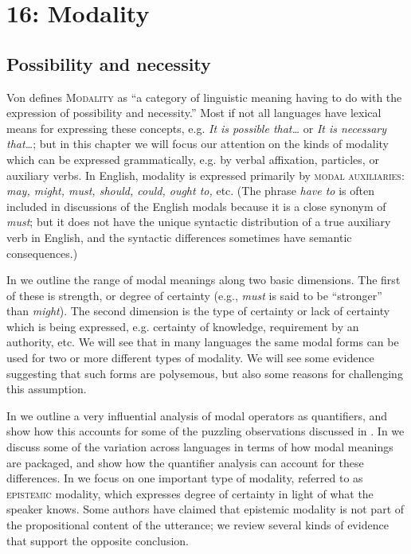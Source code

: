 \chapter{{16}: Modality}

\section{Possibility and necessity}\label{sec:} %

Von \citet{Fintel2006} defines \textsc{Modality} as “a category of linguistic meaning having to do with the expression of possibility and necessity.” Most if not all languages have lexical means for expressing these concepts, e.g. \textit{It is possible that…} or \textit{It is necessary} \textit{that…}; but in this chapter we will focus our attention on the kinds of modality which can be expressed grammatically, e.g. by verbal affixation, particles, or auxiliary verbs. In English, modality is expressed primarily by \textsc{modal auxiliaries}: \textit{may, might, must, should, could, ought to,} etc. (The phrase \textit{have to} is often included in discussions of the English modals because it is a close synonym of \textit{must}; but it does not have the unique syntactic distribution of a true auxiliary verb in English, and the syntactic differences sometimes have semantic consequences.)



In  we outline the range of modal meanings along two basic dimensions. The first of these is strength, or degree of certainty (e.g., \textit{must} is said to be “stronger” than \textit{might}). The second dimension is the type of certainty or lack of certainty which is being expressed, e.g. certainty of knowledge, requirement by an authority, etc. We will see that in many languages the same modal forms can be used for two or more different types of modality. We will see some evidence suggesting that such forms are polysemous, but also some reasons for challenging this assumption.



In  we outline a very influential analysis of modal operators as quantifiers, and show how this accounts for some of the puzzling observations discussed in . In  we discuss some of the variation across languages in terms of how modal meanings are packaged, and show how the quantifier analysis can account for these differences. In  we focus on one important type of modality, referred to as \textsc{epistemic} modality, which expresses degree of certainty in light of what the speaker knows. Some authors have claimed that epistemic modality is not part of the propositional content of the utterance; we review several kinds of evidence that support the opposite conclusion.


